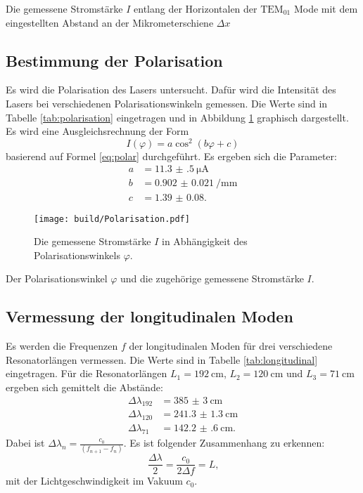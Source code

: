 \begin{table}
	\centering
	\caption{Die gemessene Stromstärke $I$ entlang der Horizontalen der $\text{TEM}_{\text{01}}$ Mode mit dem eingestellten Abstand an der Mikrometerschiene $\Delta x$}
	
	
	\label{tab:T01}
\end{table}

\subsection{Bestimmung der Polarisation}

Es wird die Polarisation des Lasers untersucht. Dafür wird die Intensität des Lasers bei verschiedenen Polarisationswinkeln gemessen. Die Werte sind in Tabelle \ref{tab:polarisation} eingetragen und in Abbildung \ref{fig:polarisation} graphisch dargestellt. 
Es wird eine Ausgleichsrechnung der Form
\[
I(\varphi) = a\cos^2\left(b\varphi+c\right)
\] 
basierend auf Formel \eqref{eq:polar} durchgeführt.
Es ergeben sich die Parameter:
\begin{align*}
a &= \SI{11.3(5)}{\micro\ampere}\\
b &= \SI{0.902(21)}{\per\milli\metre}\\
c &= \num{1.39(8)}\text{.}
\end{align*}

\begin{figure}
	\centering
	\texttt{[image: build/Polarisation.pdf]}
	\caption{Die gemessene Stromstärke $I$ in Abhängigkeit des Polarisationswinkels $\varphi$.}
	\label{fig:polarisation}
\end{figure}

\begin{table}
	\centering
	\caption{Der Polarisationswinkel $\varphi$ und die zugehörige gemessene Stromstärke $I$.}
	
	\label{tab:polarisation}
\end{table}

\subsection{Vermessung der longitudinalen Moden}

Es werden die Frequenzen $f$ der longitudinalen Moden für drei verschiedene Resonatorlängen vermessen. Die Werte sind in Tabelle \ref{tab:longitudinal} eingetragen.
Für die Resonatorlängen $L_1=\SI{192}{\centi\metre}$, $L_2=\SI{120}{\centi\metre}$ und $L_3=\SI{71}{\centi\metre}$ ergeben sich gemittelt die Abstände:
\begin{align*}
\Delta\lambda_{192} &= \SI{385(3)}{\centi\metre}\\
\Delta\lambda_{120} &= \SI{241.3(13)}{\centi\metre}\\
\Delta\lambda_{71} &= \SI{142.2(6)}{\centi\metre}\text{.}
\end{align*}
Dabei ist $\Delta\lambda_n = \frac{c_0}{(f_{n+1}-f_n)}$.
Es ist folgender Zusammenhang zu erkennen:
\[
\frac{\Delta\lambda}{2} = \frac{c_0}{2\Delta f} = L \text{,}
\]
mit der Lichtgeschwindigkeit im Vakuum $c_0$.

